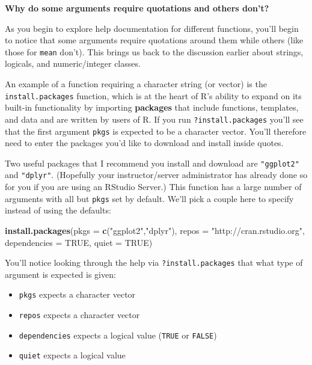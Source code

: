 \documentclass[]{tufte-book}
\newenvironment{Shaded}{\begin{snugshade}}{\end{snugshade}}
\newcommand{\KeywordTok}[1]{\textcolor[rgb]{0.13,0.29,0.53}{\textbf{{#1}}}}
\newcommand{\DataTypeTok}[1]{\textcolor[rgb]{0.13,0.29,0.53}{{#1}}}
\newcommand{\StringTok}[1]{\textcolor[rgb]{0.31,0.60,0.02}{{#1}}}
\newcommand{\OtherTok}[1]{\textcolor[rgb]{0.56,0.35,0.01}{{#1}}}
\newcommand{\NormalTok}[1]{{#1}}
\providecommand{\tightlist}{%
  \setlength{\itemsep}{0pt}\setlength{\parskip}{0pt}}
\begin{document}
\vspace*{0.2in}

\noindent\textbf{Why do some arguments require quotations and others don't?}\vspace*{0.1in}

As you begin to explore help documentation for different functions,
you'll begin to notice that some arguments require quotations around
them while others (like those for \texttt{mean} don't). This brings us
back to the discussion earlier about strings, logicals, and
numeric/integer classes.

An example of a function requiring a character string (or vector) is the
\texttt{install.packages} function, which is at the heart of R's ability
to expand on its built-in functionality by importing \textbf{packages}
that include functions, templates, and data and are written by users of
R. If you run \texttt{?install.packages} you'll see that the first
argument \texttt{pkgs} is expected to be a character vector. You'll
therefore need to enter the packages you'd like to download and install
inside quotes.

Two useful packages that I recommend you install and download are
\texttt{"ggplot2"} and \texttt{"dplyr"}. (Hopefully your
instructor/server administrator has already done so for you if you are
using an RStudio Server.) This function has a large number of arguments
with all but \texttt{pkgs} set by default. We'll pick a couple here to
specify instead of using the defaults:

\begin{Shaded}
\begin{Highlighting}[]
\KeywordTok{install.packages}\NormalTok{(}\DataTypeTok{pkgs =} \KeywordTok{c}\NormalTok{(}\StringTok{"ggplot2"}\NormalTok{,}\StringTok{"dplyr"}\NormalTok{),}
                 \DataTypeTok{repos =} \StringTok{"http://cran.rstudio.org"}\NormalTok{,}
                 \DataTypeTok{dependencies =} \OtherTok{TRUE}\NormalTok{,}
                 \DataTypeTok{quiet =} \OtherTok{TRUE}\NormalTok{)}
\end{Highlighting}
\end{Shaded}

You'll notice looking through the help via \texttt{?install.packages}
that what type of argument is expected is given:

\begin{itemize}
\tightlist
\item
  \texttt{pkgs} expects a character vector
\item
  \texttt{repos} expects a character vector
\item
  \texttt{dependencies} expects a logical value (\texttt{TRUE} or
  \texttt{FALSE})
\item
  \texttt{quiet} expects a logical value
\end{itemize}
\end{document}
